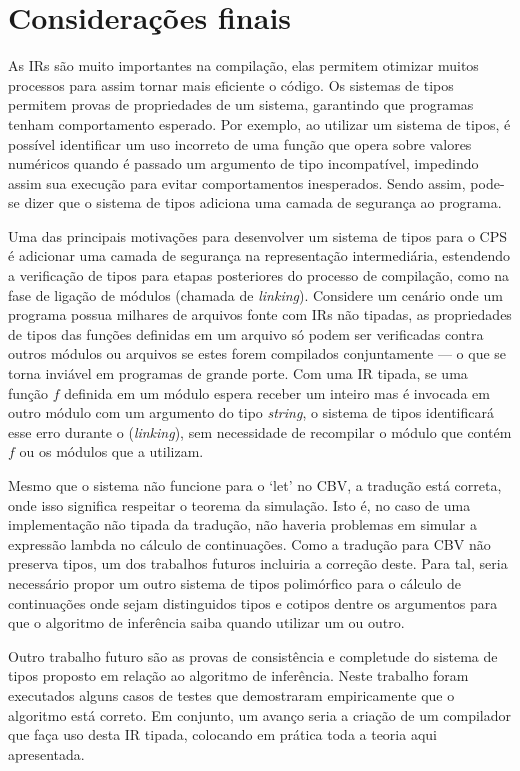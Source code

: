 \section{Considerações finais}

As IRs são muito importantes na compilação, elas permitem otimizar muitos processos para assim tornar mais eficiente o código.
Os sistemas de tipos permitem provas de propriedades de um sistema, garantindo que programas tenham comportamento esperado.
Por exemplo, ao utilizar um sistema de tipos, é possível identificar um uso incorreto de uma função que opera sobre valores numéricos quando é passado um argumento de tipo incompatível, impedindo assim sua execução para evitar comportamentos inesperados.
Sendo assim, pode-se dizer que o sistema de tipos adiciona uma camada de segurança ao programa.

Uma das principais motivações para desenvolver um sistema de tipos para o CPS é adicionar uma camada de segurança na representação intermediária, estendendo a verificação de tipos para etapas posteriores do processo de compilação, como na fase de ligação de módulos (chamada de \textit{linking}).
Considere um cenário onde um programa possua milhares de arquivos fonte com IRs não tipadas, as propriedades de tipos das funções definidas em um arquivo só podem ser verificadas contra outros módulos ou arquivos se estes forem compilados conjuntamente {---} o que se torna inviável em programas de grande porte.
Com uma IR tipada, se uma função $f$ definida em um módulo espera receber um inteiro mas é invocada em outro módulo com um argumento do tipo \textit{string}, o sistema de tipos identificará esse erro durante o (\textit{linking}), sem necessidade de recompilar o módulo que contém $f$ ou os módulos que a utilizam.

Mesmo que o sistema não funcione para o `let' no CBV, a tradução está correta, onde isso significa respeitar o teorema da simulação.
Isto é, no caso de uma implementação não tipada da tradução, não haveria problemas em simular a expressão lambda no cálculo de continuações.
Como a tradução para CBV não preserva tipos, um dos trabalhos futuros incluiria a correção deste.
Para tal, seria necessário propor um outro sistema de tipos polimórfico para o cálculo de continuações onde sejam distinguidos tipos e cotipos dentre os argumentos para que o algoritmo de inferência saiba quando utilizar um ou outro.

Outro trabalho futuro são as provas de consistência e completude do sistema de tipos proposto em relação ao algoritmo de inferência.
Neste trabalho foram executados alguns casos de testes que demostraram empiricamente que o algoritmo está correto.
Em conjunto, um avanço seria a criação de um compilador que faça uso desta IR tipada, colocando em prática toda a teoria aqui apresentada.
